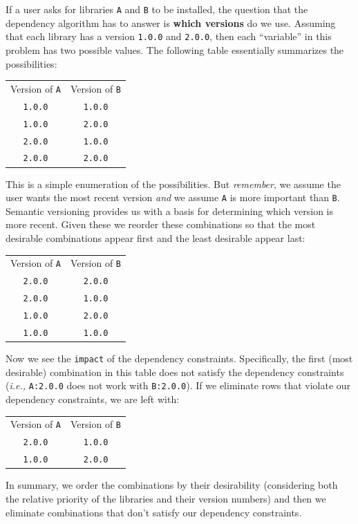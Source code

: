 \documentclass[11pt,a4paper,twocolumn]{article}
\renewcommand{\small}{\fontsize{9.5pt}{11.1pt}\selectfont}
\newcommand{\code}[1]{\texttt{#1}} %
\begin{document}
If a user asks for libraries \code{A} and \code{B} to be installed,
the question that the dependency algorithm has to answer is \textbf{which
  versions} do we use.  Assuming that each library has a version
\code{1.0.0} and \code{2.0.0}, then each ``variable'' in this
problem has two possible values.  The following table essentially
summarizes the possibilities:
{\small
\begin{center}
\begin{tabular}{cc}
  Version of \code{A} & Version of \code{B} \\
  \code{1.0.0} & \code{1.0.0} \\
  \code{1.0.0} & \code{2.0.0} \\
  \code{2.0.0} & \code{1.0.0} \\
  \code{2.0.0} & \code{2.0.0} \\
\end{tabular}
\end{center}
}
This is a simple enumeration of the possibilities.  But
\emph{remember}, we assume the user wants the most recent version
\emph{and} we assume \code{A} is more important than \code{B}.  Semantic
versioning provides us with a basis for determining which version is
more recent.  Given these we reorder these combinations so that the
most desirable combinations appear first and the least desirable
appear last:
{\small
\begin{center}
\begin{tabular}{cc}
  Version of \code{A} & Version of \code{B} \\
  \code{2.0.0} & \code{2.0.0} \\
  \code{2.0.0} & \code{1.0.0} \\
  \code{1.0.0} & \code{2.0.0} \\
  \code{1.0.0} & \code{1.0.0} \\
\end{tabular}
\end{center}
}
Now we see the \code{impact} of the dependency constraints.  Specifically,
the first (most desirable) combination in this table does not satisfy
the dependency constraints (\emph{i.e.,} \code{A:2.0.0} does not work
with \code{B:2.0.0}).  If we eliminate rows that violate our
dependency constraints, we are left with:
{\small
\begin{center}
\begin{tabular}{cc}
  Version of \code{A} & Version of \code{B} \\
  \code{2.0.0} & \code{1.0.0} \\
  \code{1.0.0} & \code{2.0.0} \\
\end{tabular}
\end{center}
}
In summary, we order the combinations by their desirability
(considering both the relative priority of the libraries and their
version numbers) and then we eliminate combinations that don't satisfy
our dependency constraints.
\end{document}
